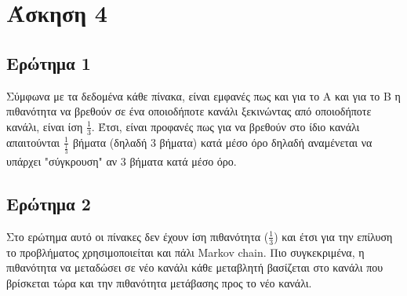 \section*{Άσκηση 4}
\label{ex4}

\subsection*{Ερώτημα 1}
\label{ex4q1}

Σύμφωνα με τα δεδομένα κάθε πίνακα, είναι εμφανές πως και για το Α και για το Β η πιθανότητα να βρεθούν σε ένα οποιοδήποτε κανάλι ξεκινώντας από οποιοδήποτε κανάλι, είναι ίση $\frac{1}{3}$. Έτσι, είναι προφανές πως για να βρεθούν στο ίδιο κανάλι απαιτούνται $\frac{1}{\frac{1}{3}}$ βήματα (δηλαδή 3 βήματα) κατά μέσο όρο δηλαδή αναμένεται να υπάρχει "σύγκρουση" αν 3 βήματα κατά μέσο όρο.

\subsection*{Ερώτημα 2}
\label{ex4q2}

Στο ερώτημα αυτό οι πίνακες δεν έχουν ίση πιθανότητα ($\frac{1}{3}$) και έτσι για την επίλυση το προβλήματος χρησιμοποιείται και πάλι Markov chain. Πιο συγκεκριμένα, η πιθανότητα να μεταδώσει σε νέο κανάλι κάθε μεταβλητή βασίζεται στο κανάλι που βρίσκεται τώρα και την πιθανότητα μετάβασης προς το νέο κανάλι.

